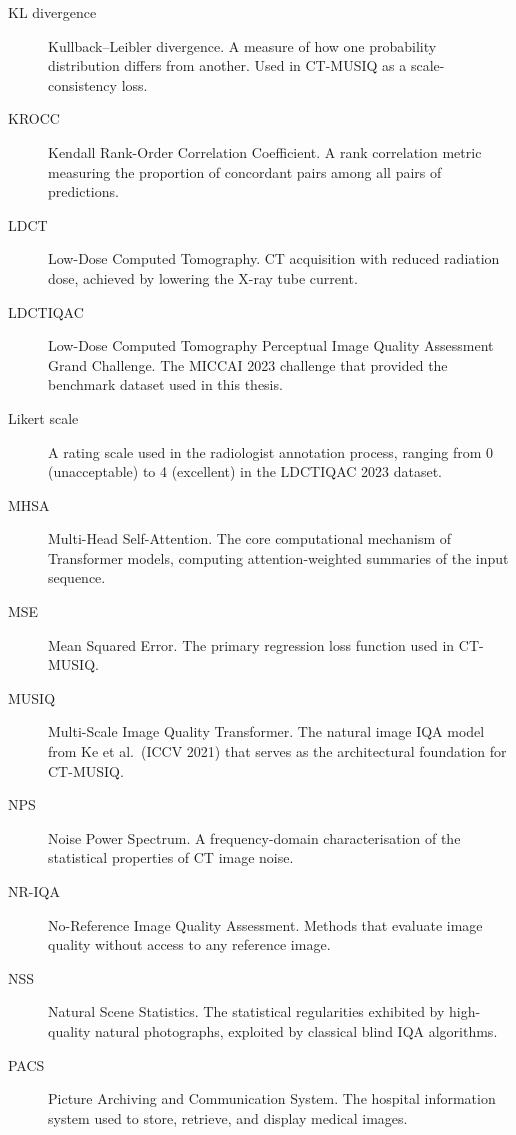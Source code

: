 \begin{description}
    \item[KL divergence] Kullback--Leibler divergence. A measure of how one probability
    distribution differs from another. Used in CT-MUSIQ as a scale-consistency loss.

    \item[KROCC] Kendall Rank-Order Correlation Coefficient. A rank correlation metric
    measuring the proportion of concordant pairs among all pairs of predictions.

    \item[LDCT] Low-Dose Computed Tomography. CT acquisition with reduced radiation dose,
    achieved by lowering the X-ray tube current.

    \item[LDCTIQAC] Low-Dose Computed Tomography Perceptual Image Quality Assessment
    Grand Challenge. The MICCAI 2023 challenge that provided the benchmark dataset used
    in this thesis.

    \item[Likert scale] A rating scale used in the radiologist annotation process,
    ranging from 0 (unacceptable) to 4 (excellent) in the LDCTIQAC 2023 dataset.

    \item[MHSA] Multi-Head Self-Attention. The core computational mechanism of
    Transformer models, computing attention-weighted summaries of the input sequence.

    \item[MSE] Mean Squared Error. The primary regression loss function used in CT-MUSIQ.

    \item[MUSIQ] Multi-Scale Image Quality Transformer. The natural image IQA model
    from Ke et al.\ (ICCV 2021) that serves as the architectural foundation for CT-MUSIQ.

    \item[NPS] Noise Power Spectrum. A frequency-domain characterisation of the
    statistical properties of CT image noise.

    \item[NR-IQA] No-Reference Image Quality Assessment. Methods that evaluate image
    quality without access to any reference image.

    \item[NSS] Natural Scene Statistics. The statistical regularities exhibited by
    high-quality natural photographs, exploited by classical blind IQA algorithms.

    \item[PACS] Picture Archiving and Communication System. The hospital information
    system used to store, retrieve, and display medical images.


\end{description}
